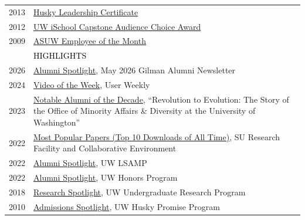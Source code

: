 \documentclass[12pt]{article}
\begin{document}
{\begin{longtable}{R{0.75in}p{5.0in}}
\footnotesize{2013} & \href{https://cele.uw.edu/programs/husky-leadership-certificate/}{Husky Leadership Certificate}\\

\footnotesize{2012} & \href{https://ischool.uw.edu/capstone/projects/awards}{UW iSchool Capstone Audience Choice Award}\\

\footnotesize{2009} & \href{https://web.archive.org/web/20200328032852/https://wiki.asuw.org/index.php/Bryan_Dosono}{ASUW Employee of the Month} \medskip \\

& \large \textcolor{black}{\uppercase{Highlights}}\\
\footnotesize{2026} & \href{https://mailchi.mp/iie/april-2026-alumni-newsletter-9440759?e=36c96d11a4}{Alumni Spotlight}, May 2026 Gilman Alumni Newsletter\\

\footnotesize{2024} & \href{https://www.userweekly.com/quant-uxr-projects/}{Video of the Week}, User Weekly\\

\footnotesize{2023} & \href{https://magazine.washington.edu/feature/new-book-tells-the-story-of-the-office-of-minority-affairs-diversity/}{Notable Alumni of the Decade}, ``Revolution to Evolution: The Story of the Office of Minority Affairs \& Diversity at the University of Washington''\\

\footnotesize{2022} & \href{https://web.archive.org/web/20240829155704/https://surface.syr.edu/topdownloads.html}{Most Popular Papers (Top 10 Downloads of All Time)}, SU Research Facility and Collaborative Environment\\

\footnotesize{2022} & \href{https://www.washington.edu/omad/2023/06/14/dr-bryan-dosono-winter-2022/}{Alumni Spotlight}, UW LSAMP\\

\footnotesize{2022} & \href{https://honors.uw.edu/about/honors-60th/60th-timeline/}{Alumni Spotlight}, UW Honors Program\\

\footnotesize{2018} &
\href{https://admit.washington.edu/academics/research/}{Research Spotlight}, UW Undergraduate Research Program\\

\footnotesize{2010} &
\href{https://uwadmissions.wordpress.com/husky-promise/}{Admissions Spotlight}, UW Husky Promise Program\medskip\\


\end{longtable}}
\end{document}

